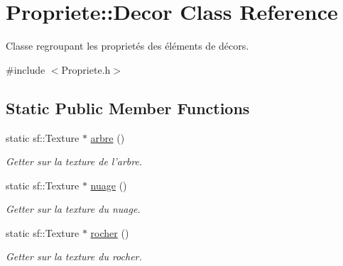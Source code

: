 \hypertarget{classPropriete_1_1Decor}{\section{Propriete\-:\-:Decor Class Reference}
\label{classPropriete_1_1Decor}
}


Classe regroupant les proprietés des éléments de décors.  




{\ttfamily \#include $<$Propriete.\-h$>$}

\subsection*{Static Public Member Functions}
\begin{DoxyCompactItemize}
\item 
\hypertarget{classPropriete_1_1Decor_a9780871798a7828874f847c49d962d8c}{static sf\-::\-Texture $\ast$ \hyperlink{classPropriete_1_1Decor_a9780871798a7828874f847c49d962d8c}{arbre} ()}\label{classPropriete_1_1Decor_a9780871798a7828874f847c49d962d8c}

\begin{DoxyCompactList}\small\item\em Getter sur la texture de l'arbre. \end{DoxyCompactList}\item 
\hypertarget{classPropriete_1_1Decor_aa7ad19de416491e66649f79493324db9}{static sf\-::\-Texture $\ast$ \hyperlink{classPropriete_1_1Decor_aa7ad19de416491e66649f79493324db9}{nuage} ()}\label{classPropriete_1_1Decor_aa7ad19de416491e66649f79493324db9}

\begin{DoxyCompactList}\small\item\em Getter sur la texture du nuage. \end{DoxyCompactList}\item 
\hypertarget{classPropriete_1_1Decor_a38b6c6ab92e4a3004f3a2d75b9a3a8b2}{static sf\-::\-Texture $\ast$ \hyperlink{classPropriete_1_1Decor_a38b6c6ab92e4a3004f3a2d75b9a3a8b2}{rocher} ()}\label{classPropriete_1_1Decor_a38b6c6ab92e4a3004f3a2d75b9a3a8b2}

\begin{DoxyCompactList}\small\item\em Getter sur la texture du rocher. \end{DoxyCompactList}\end{DoxyCompactItemize}
